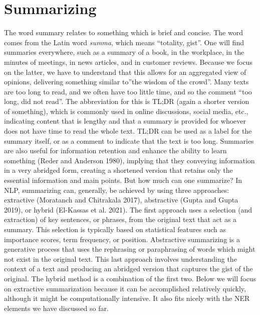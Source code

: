 \begin{Shaded}
\begin{Highlighting}[]
\NormalTok{()}
\end{Highlighting}
\end{Shaded}

\section{Summarizing}\label{summarization}

The word summary relates to something which is brief
and concise. The word comes from the Latin word \textit{summa}, which means
``totality, gist''. One will find summaries everywhere, such as a
summary of a book, in the workplace, in the minutes of meetings, in news
articles, and in customer reviews. Because we focus on the latter,
we have to understand that this allows for an aggregated view of opinions,
delivering something similar to''the wisdom of the crowd''. Many texts
are too long to read, and we often have too little time, and so the comment ``too long, did not read''. The abbreviation for this is TL;DR (again
a shorter version of something), which is commonly used in online
discussions, social media, etc., indicating content that is lengthy and that a
summary is provided for whoever does not have time to read the whole
text. TL;DR can be used as a label for the summary itself, or as a
comment to indicate that the text is too long. Summaries are also
useful for information retention and enhance the ability to learn
something (Reder and Anderson 1980), implying that they conveying
information in a very abridged form, creating a shortened version that
retains only the essential information and main points. But
how much can one summarize? In NLP, summarizing can, generally, be achieved by
using three approaches: extractive (Moratanch and Chitrakala 2017),
abstractive (Gupta and Gupta 2019), or hybrid (El-Kassas et al.
2021). The first approach uses a selection (and extraction) of key
sentences, or phrases, from the original text that act as a summary.
This selection is typically based on statistical features such as
importance scores, term frequency, or position. Abstractive summarizing is a
generative process that uses the rephrasing or paraphrasing of words which
might not exist in the original text. This last approach involves
understanding the context of a text and producing an abridged version that
captures the gist of the original. The hybrid method is a
combination of the first two. Below we will focus on extractive
summarization because it can be accomplished relatively quickly, although
it might be computationally intensive. It also fits nicely with the NER
elements we have discussed so far.

